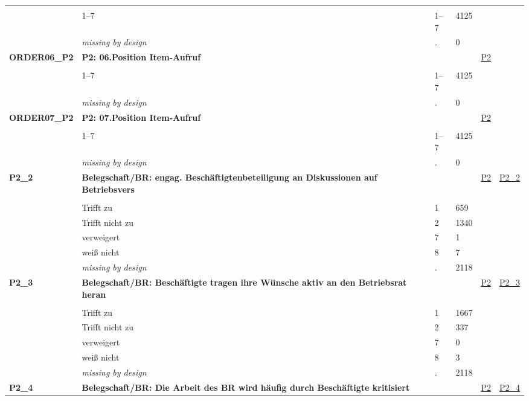 \begin{longtable}{| L{2.45cm} | L{6cm} | C{1.5cm} | R{1cm} | C{2.25cm} | C{2.25cm} |}
   &  &  &  &  &  \\ 
   & 1--7 & 1--7 & 4125 &  &  \\ 
   & \textit{missing by design} & \textit{.} & 0 &  &  \\ 
   \midrule
\textbf{ORDER06\_P2}\label{var:ORDER06:P2} & \textbf{P2: 06.Position Item-Aufruf} &  &  & \hyperref[P2]{P2} & \hyperref[var:suf:]{} \\ 
   &  &  &  &  &  \\ 
   & 1--7 & 1--7 & 4125 &  &  \\ 
   & \textit{missing by design} & \textit{.} & 0 &  &  \\ 
   \midrule
\textbf{ORDER07\_P2}\label{var:ORDER07:P2} & \textbf{P2: 07.Position Item-Aufruf} &  &  & \hyperref[P2]{P2} & \hyperref[var:suf:]{} \\ 
   &  &  &  &  &  \\ 
   & 1--7 & 1--7 & 4125 &  &  \\ 
   & \textit{missing by design} & \textit{.} & 0 &  &  \\ 
   \midrule
\textbf{P2\_2}\label{var:P2:2} & \textbf{Belegschaft/BR: engag. Beschäftigtenbeteiligung an Diskussionen auf Betriebsvers} &  &  & \hyperref[P2]{P2} & \hyperref[var:suf:P2:2]{P2\_2} \\ 
   &  &  &  &  &  \\ 
   & Trifft zu & 1 & 659 &  &  \\ 
   & Trifft nicht zu & 2 & 1340 &  &  \\ 
   & verweigert & 7 & 1 &  &  \\ 
   & weiß nicht & 8 & 7 &  &  \\ 
   & \textit{missing by design} & \textit{.} & 2118 &  &  \\ 
   \midrule
\textbf{P2\_3}\label{var:P2:3} & \textbf{Belegschaft/BR: Beschäftigte tragen ihre Wünsche aktiv an den Betriebsrat heran} &  &  & \hyperref[P2]{P2} & \hyperref[var:suf:P2:3]{P2\_3} \\ 
   &  &  &  &  &  \\ 
   & Trifft zu & 1 & 1667 &  &  \\ 
   & Trifft nicht zu & 2 & 337 &  &  \\ 
   & verweigert & 7 & 0 &  &  \\ 
   & weiß nicht & 8 & 3 &  &  \\ 
   & \textit{missing by design} & \textit{.} & 2118 &  &  \\ 
   \midrule
\textbf{P2\_4}\label{var:P2:4} & \textbf{Belegschaft/BR: Die Arbeit des BR wird häufig durch Beschäftigte kritisiert} &  &  & \hyperref[P2]{P2} & \hyperref[var:suf:P2:4]{P2\_4} \\ 

\end{longtable}
